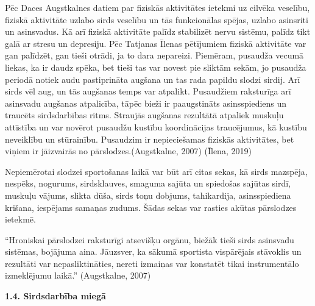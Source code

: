 \documentclass[12pt]{article}
\begin{document}
Pēc Daces Augstkalnes datiem par fiziskās aktivitātes ietekmi uz cilvēka veselību, fiziskā aktivitāte uzlabo sirds veselību un tās funkcionālas spējas, uzlabo asinsriti un asinsvadus. Kā arī fiziskā aktivitāte palīdz stabilizēt nervu sistēmu, palīdz tikt galā ar stresu un depresiju. Pēc Tatjanas Īlenas pētījumiem fiziskā aktivitāte var gan palīdzēt, gan tieši otrādi, ja to dara nepareizi. Piemēram, pusaudža vecumā liekas, ka ir daudz spēka, bet tieši tas var novest pie sliktām sekām, jo pusaudža periodā notiek audu pastiprināta augšana un tas rada papildu slodzi sirdij. Arī sirds vēl aug, un tās augšanas temps var atpalikt. Pusaudžiem raksturīga arī asinsvadu augšanas atpalicība, tāpēc bieži ir paaugstināts asinsspiediens un traucēts sirdsdarbības ritms. Straujās augšanas rezultātā atpaliek muskuļu attīstība un var novērot pusaudžu kustību koordinācijas traucējumus, kā kustību neveiklību un stūrainību. Pusaudzim ir nepieciešamas fiziskās aktivitātes, bet viņiem ir jāizvairās no pārslodzes.(Augstkalne, 2007) (Īlena, 2019)\par
Nepiemērotai slodzei sportošanas laikā var būt arī citas sekas, kā sirds mazspēja, nespēks, nogurums, sirdsklauves, smaguma sajūta un spiedošas sajūtas sirdī, muskuļu vājums, slikta dūša, sirds toņu dobjums, tahikardija, asinsspiediena krišana, iespējams samaņas zudums. Šādas sekas var rasties akūtas pārslodzes ietekmē.\par
“Hroniskai pārslodzei raksturīgi atsevišķu orgānu, biežāk tieši sirds asinsvadu sistēmas, bojājuma aina. Jāuzsver, ka sākumā sportista vispārējais stāvoklis un rezultāti var nepasliktināties, nereti izmaiņas var konstatēt tikai instrumentālo izmeklējumu laikā.” 
(Augstkalne, 2007)

\begin{center}
{\bf 1.4. Sirdsdarbība miegā}
\end{center}
\end{document}
